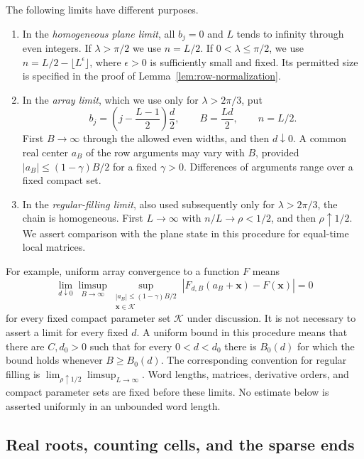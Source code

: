 The following limits have different purposes.
\begin{enumerate}
\item In the \emph{homogeneous plane limit}, all $b_j=0$ and $L$
 tends to infinity through even integers.  If $\lambda>\pi/2$ we
 use $n=L/2$.  If $0<\lambda\le\pi/2$, we use
 $n=L/2-\lfloor L^\epsilon\rfloor$, where $\epsilon>0$ is
 sufficiently small and fixed.  Its permitted size is specified in
 the proof of Lemma~\ref{lem:row-normalization}.
\item In the \emph{array limit}, which we use only for
 $\lambda>2\pi/3$, put
 \[
 b_j=\left(j-\frac{L-1}{2}\right)\frac d2,\qquad
 B=\frac{Ld}{2},\qquad n=L/2.
 \]
 First $B\to\infty$ through the allowed even widths, and then
 $d\downarrow0$.  A common real center $a_B$ of the row arguments
 may vary with $B$, provided
 $|a_B|\le(1-\gamma)B/2$ for a fixed $\gamma>0$.
 Differences of arguments range over a fixed compact set.
\item In the \emph{regular-filling limit}, also used subsequently
 only for $\lambda>2\pi/3$, the chain is homogeneous.  First
 $L\to\infty$ with $n/L\to\rho<1/2$, and then
 $\rho\uparrow1/2$.  We assert comparison with the plane state in
 this procedure for equal-time local matrices.
\end{enumerate}
For example, uniform array convergence to a function $F$ means
\begin{equation}\label{eq:array-limit-convention}
 \lim_{d\downarrow0}\limsup_{B\to\infty}
 \sup_{\substack{|a_B|\le(1-\gamma)B/2\\
                  \boldsymbol{x}\in\mathcal K}}
 |F_{d,B}(a_B+\boldsymbol{x})-F(\boldsymbol{x})|=0
\end{equation}
for every fixed compact parameter set $\mathcal K$ under discussion.
It is not necessary to assert a limit for every fixed $d$.
A uniform bound in this procedure means that there are $C,d_0>0$
such that for every $0<d<d_0$ there is $B_0(d)$ for which the bound
holds whenever $B\ge B_0(d)$.  The corresponding convention for
regular filling is $\lim_{\rho\uparrow1/2}\limsup_{L\to\infty}$.
Word lengths, matrices, derivative orders, and compact parameter
sets are fixed before these limits.  No estimate below is asserted
uniformly in an unbounded word length.

\subsection{Real roots, counting cells, and the sparse ends}

